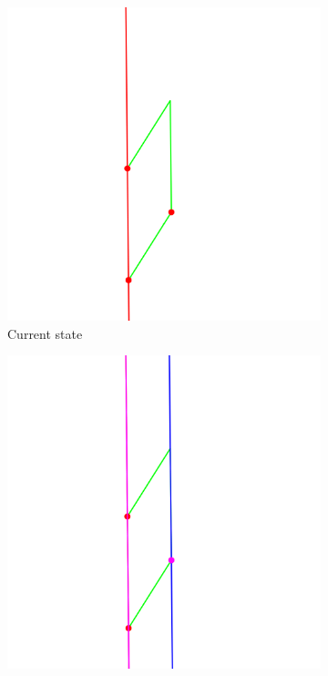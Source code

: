 \begin{figure}[!htb]
     \centering
     \begin{subfigure}[t]{0.32\textwidth}
         \centering
         \includegraphics[width=\textwidth]{img/hypothesis_explorer/input.png}
         \caption{Current state}
         \label{fig:hypotheses_explorer_input}
     \end{subfigure}
     \hfill
     \begin{subfigure}[t]{0.32\textwidth}
         \centering
         \includegraphics[width=\textwidth]{img/hypothesis_explorer/source_07_score_0_999_Parallel.png}

\end{subfigure}
\end{figure}
